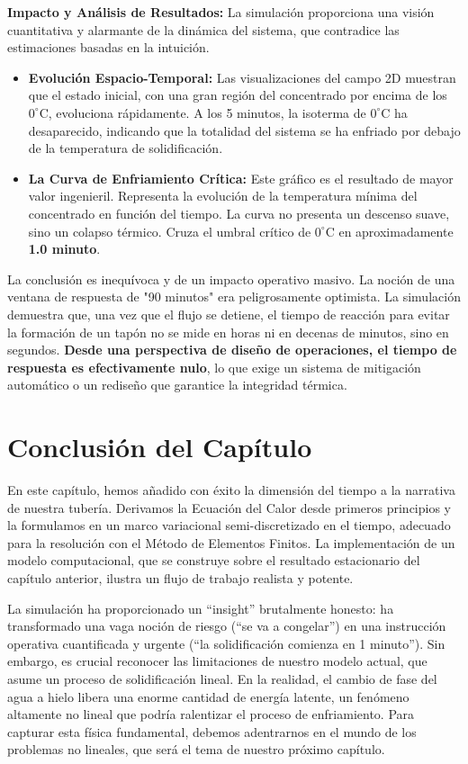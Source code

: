 \textbf{Impacto y Análisis de Resultados:} La simulación proporciona una visión cuantitativa y alarmante de la dinámica del sistema, que contradice las estimaciones basadas en la intuición.
\begin{itemize}
    \item \textbf{Evolución Espacio-Temporal:} Las visualizaciones del campo 2D muestran que el estado inicial, con una gran región del concentrado por encima de los \(0^\circ\text{C}\), evoluciona rápidamente. A los 5 minutos, la isoterma de \(0^\circ\text{C}\) ha desaparecido, indicando que la totalidad del sistema se ha enfriado por debajo de la temperatura de solidificación.
    \item \textbf{La Curva de Enfriamiento Crítica:} Este gráfico es el resultado de mayor valor ingenieril. Representa la evolución de la temperatura mínima del concentrado en función del tiempo. La curva no presenta un descenso suave, sino un colapso térmico. Cruza el umbral crítico de \(0^\circ\text{C}\) en aproximadamente \textbf{1.0 minuto}.
\end{itemize}
La conclusión es inequívoca y de un impacto operativo masivo. La noción de una ventana de respuesta de "90 minutos" era peligrosamente optimista. La simulación demuestra que, una vez que el flujo se detiene, el tiempo de reacción para evitar la formación de un tapón no se mide en horas ni en decenas de minutos, sino en segundos. \textbf{Desde una perspectiva de diseño de operaciones, el tiempo de respuesta es efectivamente nulo}, lo que exige un sistema de mitigación automático o un rediseño que garantice la integridad térmica.

\section*{Conclusión del Capítulo}
En este capítulo, hemos añadido con éxito la dimensión del tiempo a la narrativa de nuestra tubería. Derivamos la Ecuación del Calor desde primeros principios y la formulamos en un marco variacional semi-discretizado en el tiempo, adecuado para la resolución con el Método de Elementos Finitos. La implementación de un modelo computacional, que se construye sobre el resultado estacionario del capítulo anterior, ilustra un flujo de trabajo realista y potente.

La simulación ha proporcionado un ``insight'' brutalmente honesto: ha transformado una vaga noción de riesgo (``se va a congelar'') en una instrucción operativa cuantificada y urgente (``la solidificación comienza en 1 minuto''). Sin embargo, es crucial reconocer las limitaciones de nuestro modelo actual, que asume un proceso de solidificación lineal. En la realidad, el cambio de fase del agua a hielo libera una enorme cantidad de energía latente, un fenómeno altamente no lineal que podría ralentizar el proceso de enfriamiento. Para capturar esta física fundamental, debemos adentrarnos en el mundo de los problemas no lineales, que será el tema de nuestro próximo capítulo.